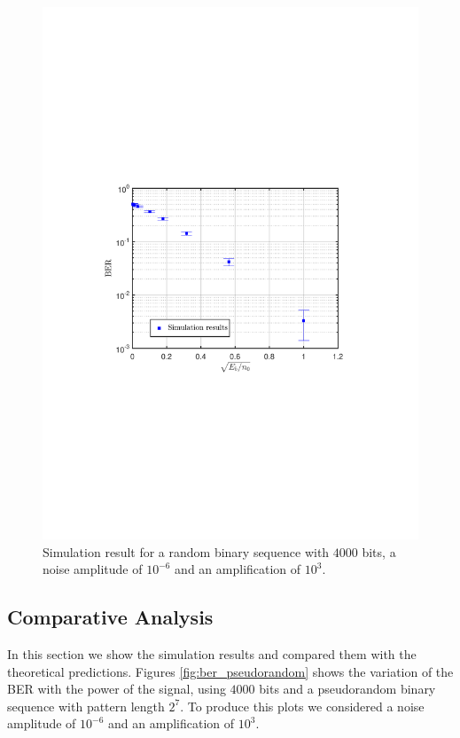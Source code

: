 \begin{figure}[]
	\centering
	\includegraphics[clip, trim=0.5cm 9cm 0.5cm 9cm, width=\textwidth]{./sdf/m_qam_system/figures/BER_QPSK_sim_pseudorandom7_Eb_n0_onlySim.pdf}
	\caption{Simulation result for a random binary sequence with $4000$ bits, a noise amplitude of $10^{-6}$ and an amplification of $10^3$.}
	\label{fig:ber_pseudorandom_sim}
\end{figure}

\pagebreak
\clearpage
\newpage
\subsection{Comparative Analysis}

In this section we show the simulation results and compared them with the theoretical predictions. Figures \ref{fig:ber_pseudorandom} shows the variation of the BER with the power of the signal, using $4000$ bits and a pseudorandom binary sequence with pattern length $2^7$. To produce this plots we considered a noise amplitude of $10^{-6}$ and an amplification of $10^3$. 

